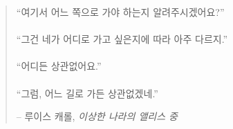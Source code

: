 
\newpage \vspace*{4cm}
\thispagestyle{empty}
\begin{quotation}
	\begin{center}
		\large
		\enquote{여기서 어느 쪽으로 가야 하는지 알려주시겠어요?} \\~\\
		\enquote{그건 네가 어디로 가고 싶은지에 따라 아주 다르지.} \\~\\
		\enquote{어디든 상관없어요.} \\~\\
		\enquote{그럼, 어느 길로 가든 상관없겠네.}
	\end{center}
	\begin{flushright} -- 루이스 캐롤, \textit{이상한 나라의 앨리스 중}\end{flushright}
\end{quotation}
